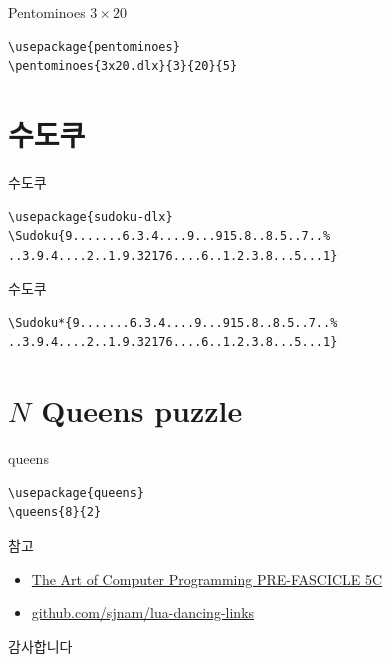 \documentclass{beamer}
\begin{document}
%
\begin{frame}[fragile]{Pentominoes $3\times20$}
\begin{verbatim}
\usepackage{pentominoes}
\pentominoes{3x20.dlx}{3}{20}{5}
\end{verbatim}  
\end{frame}

\section{수도쿠}

%
\begin{frame}[fragile]{수도쿠}
\begin{verbatim}
\usepackage{sudoku-dlx}
\Sudoku{9.......6.3.4....9...915.8..8.5..7..%
..3.9.4....2..1.9.32176....6..1.2.3.8...5...1}
\end{verbatim}  

\begin{center}
\end{center}
\end{frame}

%
\begin{frame}[fragile]{수도쿠}
\begin{verbatim}
\Sudoku*{9.......6.3.4....9...915.8..8.5..7..%
..3.9.4....2..1.9.32176....6..1.2.3.8...5...1}
\end{verbatim}

\begin{center}
\end{center}
\end{frame}

\section{$N$ Queens puzzle}

%
\begin{frame}[fragile]{queens}
\begin{verbatim}
\usepackage{queens}
\queens{8}{2}
\end{verbatim}
\vspace{-10mm}
\end{frame}

%
\begin{frame}{참고}
  \begin{itemize}
  \item \href{http://www-cs-faculty.stanford.edu/~knuth/fasc5c.ps.gz}
    {The Art of Computer Programming PRE-FASCICLE 5C}
  \item \href{https://github.com/sjnam/lua-dancing-links}
    {github.com/sjnam/lua-dancing-links}
  \end{itemize}
\end{frame}


%
\begin{frame}[standout]
  감사합니다
\end{frame}
\end{document}
